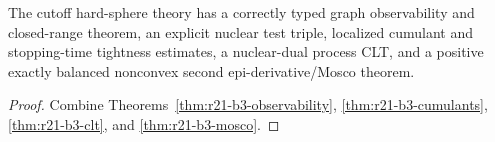 \begin{theorem}
\label{thm:r21-b3-main}
The cutoff hard-sphere theory has a correctly typed graph observability and
closed-range theorem, an explicit nuclear test triple, localized cumulant and
stopping-time tightness estimates, a nuclear-dual process CLT, and a positive
exactly balanced nonconvex second epi-derivative/Mosco theorem.
\end{theorem}

\begin{proof}
Combine Theorems~\ref{thm:r21-b3-observability},
\ref{thm:r21-b3-cumulants}, \ref{thm:r21-b3-clt}, and
\ref{thm:r21-b3-mosco}.
\end{proof}
